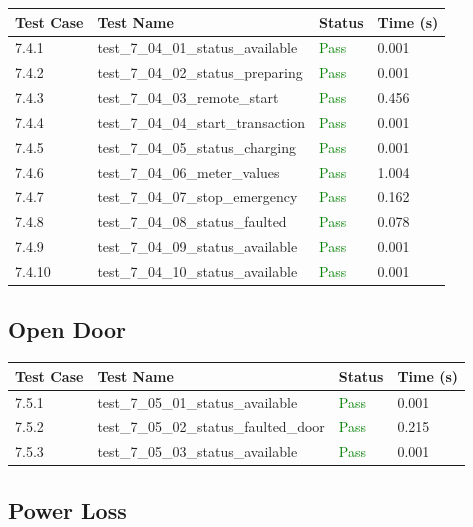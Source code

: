 \documentclass{article}
\begin{document}
\begin{longtable}{p{} p{} p{} p{}}
\toprule
\textbf{Test Case} & \textbf{Test Name} & \textbf{Status} & \textbf{Time (s)} \\
\midrule
\endhead
7.4.1 & test\_7\_04\_01\_status\_available & \textcolor{green}{Pass} & 0.001 \\
7.4.2 & test\_7\_04\_02\_status\_preparing & \textcolor{green}{Pass} & 0.001 \\
7.4.3 & test\_7\_04\_03\_remote\_start & \textcolor{green}{Pass} & 0.456 \\
7.4.4 & test\_7\_04\_04\_start\_transaction & \textcolor{green}{Pass} & 0.001 \\
7.4.5 & test\_7\_04\_05\_status\_charging & \textcolor{green}{Pass} & 0.001 \\
7.4.6 & test\_7\_04\_06\_meter\_values & \textcolor{green}{Pass} & 1.004 \\
7.4.7 & test\_7\_04\_07\_stop\_emergency & \textcolor{green}{Pass} & 0.162 \\
7.4.8 & test\_7\_04\_08\_status\_faulted & \textcolor{green}{Pass} & 0.078 \\
7.4.9 & test\_7\_04\_09\_status\_available & \textcolor{green}{Pass} & 0.001 \\
7.4.10 & test\_7\_04\_10\_status\_available & \textcolor{green}{Pass} & 0.001 \\
\bottomrule
\end{longtable}
\subsection{Open Door}

\begin{longtable}{p{} p{} p{} p{}}
\toprule
\textbf{Test Case} & \textbf{Test Name} & \textbf{Status} & \textbf{Time (s)} \\
\midrule
\endhead
7.5.1 & test\_7\_05\_01\_status\_available & \textcolor{green}{Pass} & 0.001 \\
7.5.2 & test\_7\_05\_02\_status\_faulted\_door & \textcolor{green}{Pass} & 0.215 \\
7.5.3 & test\_7\_05\_03\_status\_available & \textcolor{green}{Pass} & 0.001 \\
\bottomrule
\end{longtable}
\subsection{Power Loss}
\end{document}
